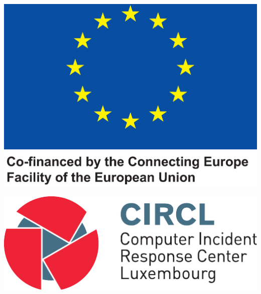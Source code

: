 \documentclass{article}
\begin{document}
\includegraphics[scale=0.2]{en_square_cef_logo.eps}

\includegraphics[scale=0.3]{logo-circl.pdf}
\end{document}
